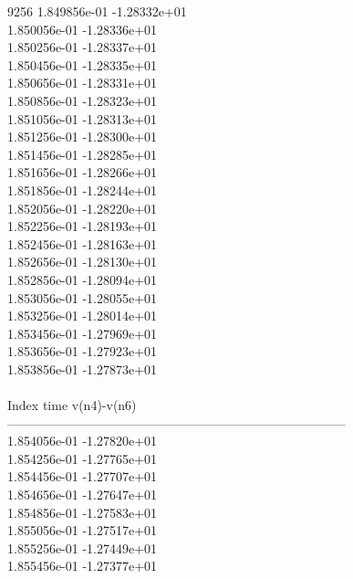 9256	1.849856e-01	-1.28332e+01	\\ 	1.850056e-01	-1.28336e+01	\\ 	1.850256e-01	-1.28337e+01	\\ 	1.850456e-01	-1.28335e+01	\\ 	1.850656e-01	-1.28331e+01	\\ 	1.850856e-01	-1.28323e+01	\\ 	1.851056e-01	-1.28313e+01	\\ 	1.851256e-01	-1.28300e+01	\\ 	1.851456e-01	-1.28285e+01	\\ 	1.851656e-01	-1.28266e+01	\\ 	1.851856e-01	-1.28244e+01	\\ 	1.852056e-01	-1.28220e+01	\\ 	1.852256e-01	-1.28193e+01	\\ 	1.852456e-01	-1.28163e+01	\\ 	1.852656e-01	-1.28130e+01	\\ 	1.852856e-01	-1.28094e+01	\\ 	1.853056e-01	-1.28055e+01	\\ 	1.853256e-01	-1.28014e+01	\\ 	1.853456e-01	-1.27969e+01	\\ 	1.853656e-01	-1.27923e+01	\\ 	1.853856e-01	-1.27873e+01	\\ \hline
\\ \hline
Index   time            v(n4)-v(n6)     \\ \hline
--------------------------------------------------------------------------------\\ 	1.854056e-01	-1.27820e+01	\\ 	1.854256e-01	-1.27765e+01	\\ 	1.854456e-01	-1.27707e+01	\\ 	1.854656e-01	-1.27647e+01	\\ 	1.854856e-01	-1.27583e+01	\\ 	1.855056e-01	-1.27517e+01	\\ 	1.855256e-01	-1.27449e+01	\\ 	1.855456e-01	-1.27377e+01	\\ \hline
